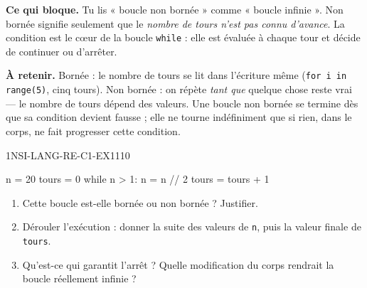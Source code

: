 

\textbf{Ce qui bloque.} Tu lis « boucle non bornée » comme « boucle infinie ». Non bornée
signifie seulement que le \emph{nombre de tours n'est pas connu d'avance}. La condition est le
cœur de la boucle \lstinline{while} : elle est évaluée à chaque tour et décide de continuer ou
d'arrêter.

\textbf{À retenir.} Bornée : le nombre de tours se lit dans l'écriture même
(\lstinline{for i in range(5)}, cinq tours). Non bornée : on répète \emph{tant que} quelque
chose reste vrai — le nombre de tours dépend des valeurs. Une boucle non bornée se termine
dès que sa condition devient fausse ; elle ne tourne indéfiniment que si rien, dans le corps,
ne fait progresser cette condition.

\begin{exercice}{1NSI-LANG-RE-C1-EX1}{1}{10}
\begin{python}
n = 20
tours = 0
while n > 1:
    n = n // 2
    tours = tours + 1
\end{python}
\begin{enumerate}
  \item Cette boucle est-elle bornée ou non bornée ? Justifier.
  \item Dérouler l'exécution : donner la suite des valeurs de \lstinline{n}, puis la valeur
        finale de \lstinline{tours}.
  \item Qu'est-ce qui garantit l'arrêt ? Quelle modification du corps rendrait la boucle
        réellement infinie ?
\end{enumerate}
\end{exercice}

